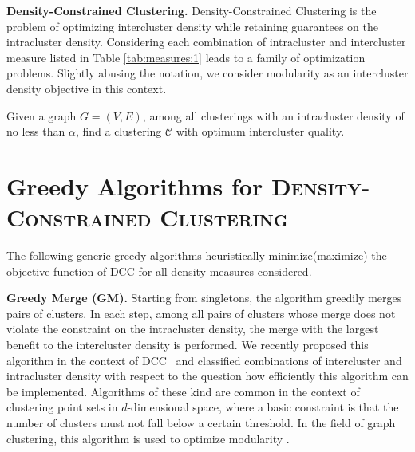 \documentclass{llncs}
\newcommand{\C}{\ensuremath{\mathcal{C}}}
\newcommand{\algo}[1]{\textsc{#1}}
\newcommand{\andreapar}{\vspace*{.5ex}\par\noindent}
\begin{document}
\setlength{\extrarowheight}{0pt}
\andreapar\textbf{Density-Constrained Clustering.}
Density-Constrained Clustering is the problem of optimizing intercluster density while retaining guarantees on the intracluster density.
Considering each combination of intracluster and intercluster measure listed in Table \ref{tab:measures:1} leads to a family of optimization problems.
Slightly abusing the notation, we consider modularity as an intercluster density objective in this context.
\vspace{-2ex}
\begin{problem}[\algo{Density-Constrained Clustering(DCC)}]
  Given a graph $G=(V, E)$, among all clusterings with an intracluster density of no less than $\alpha$, find a clustering $\C$ with optimum intercluster quality.
\end{problem}
\section{Greedy Algorithms for \textsc{Density-Constrained Clustering}}
The following generic greedy algorithms heuristically minimize(maximize) the objective function of \textsc{DCC} for all density measures considered.  
\andreapar\textbf{Greedy Merge (GM).}
Starting from singletons, the algorithm greedily merges pairs of clusters. In each step, among all pairs of clusters whose merge does not violate the constraint on the intracluster density, the merge with the largest benefit to the intercluster density is performed.
We recently proposed this algorithm in the context of DCC~\cite{gsw-dcgc-11b} and  classified combinations of intercluster and intracluster density with respect to the question how efficiently this algorithm can be implemented.
Algorithms of these kind are common in the context of clustering point sets in $d$-dimensional space, where a basic constraint is that the number of clusters must not fall below a certain threshold. In the field of graph clustering, this algorithm is used to optimize modularity \cite{cnm-fcsln-04}.
\end{document}

